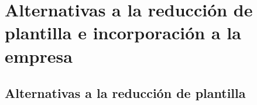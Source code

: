 %
%
%
%

\section{Alternativas a la reducción de plantilla e incorporación a la empresa}

\subsection{Alternativas a la reducción de plantilla}

